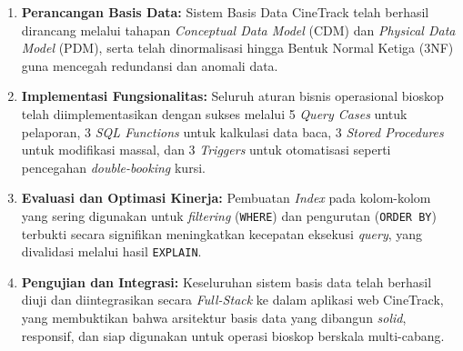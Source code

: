 \documentclass[letter,12pt,bahasa]{article}
\begin{document}
\begin{enumerate}
    \item \textbf{Perancangan Basis Data:} Sistem Basis Data CineTrack telah berhasil dirancang melalui tahapan \textit{Conceptual Data Model} (CDM) dan \textit{Physical Data Model} (PDM), serta telah dinormalisasi hingga Bentuk Normal Ketiga (3NF) guna mencegah redundansi dan anomali data.

    \item \textbf{Implementasi Fungsionalitas:} Seluruh aturan bisnis operasional bioskop telah diimplementasikan dengan sukses melalui 5 \textit{Query Cases} untuk pelaporan, 3 \textit{SQL Functions} untuk kalkulasi data baca, 3 \textit{Stored Procedures} untuk modifikasi massal, dan 3 \textit{Triggers} untuk otomatisasi seperti pencegahan \textit{double-booking} kursi.

    \item \textbf{Evaluasi dan Optimasi Kinerja:} Pembuatan \textit{Index} pada kolom-kolom yang sering digunakan untuk \textit{filtering} (\texttt{WHERE}) dan pengurutan (\texttt{ORDER BY}) terbukti secara signifikan meningkatkan kecepatan eksekusi \textit{query}, yang divalidasi melalui hasil \texttt{EXPLAIN}.

    \item \textbf{Pengujian dan Integrasi:} Keseluruhan sistem basis data telah berhasil diuji dan diintegrasikan secara \textit{Full-Stack} ke dalam aplikasi web CineTrack, yang membuktikan bahwa arsitektur basis data yang dibangun \textit{solid}, responsif, dan siap digunakan untuk operasi bioskop berskala multi-cabang.
\end{enumerate}
\end{document}
